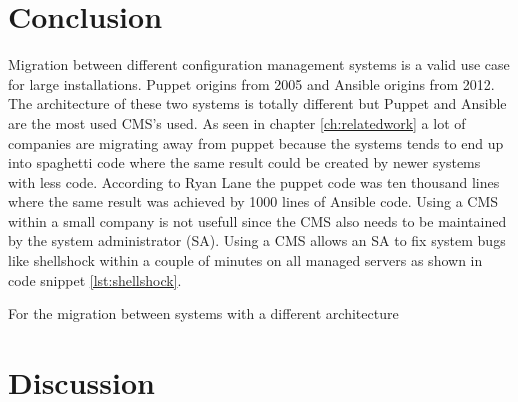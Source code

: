 \section{Conclusion}\label{sec:conclusion}
Migration between different configuration management systems is a valid use case for large installations. Puppet origins from 2005 and Ansible origins from 2012. The architecture of these two systems is totally different but Puppet and Ansible are the most used CMS's used. As seen in chapter \ref{ch:relatedwork} a lot of companies are migrating away from puppet because the systems tends to end up into spaghetti code \cite{movingawayfrompuppet} where the same result could be created by newer systems with less code. According to Ryan Lane \cite{movingawayfrompuppet} the puppet code was ten thousand lines where the same result was achieved by 1000 lines of Ansible code. Using a CMS within a small company is not usefull since the CMS also needs to be maintained by the system administrator (SA). Using a CMS allows an SA to fix system bugs like shellshock within a couple of minutes on all managed servers as shown in code snippet \ref{lst:shellshock}.

For the migration between systems with a different architecture


\section{Discussion}\label{sec:discussion}

